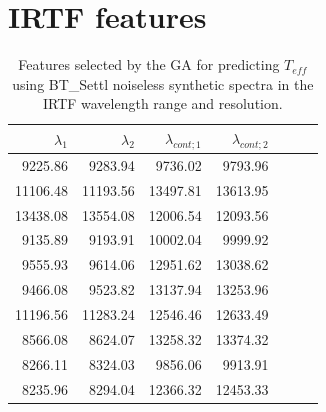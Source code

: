 
  \section{IRTF features}
\label{app:features:irtf}


%
% 
\begin{table}
\begin{center}
\begin{tabular}{rrrrrrr}
  \hline
  $\lambda_1$ & $\lambda_2$ & $\lambda_{cont;1}$ & $\lambda_{cont;2} $ \\ 
  \hline
9225.86  & 9283.94   & 9736.02  & 9793.96 \\
11106.48 & 11193.56  & 13497.81 & 13613.95 \\
13438.08 & 13554.08  & 12006.54 & 12093.56 \\
9135.89  & 9193.91   & 10002.04 & 9999.92 \\
9555.93  & 9614.06   & 12951.62 & 13038.62 \\
9466.08  & 9523.82   & 13137.94 & 13253.96 \\
11196.56 & 11283.24  & 12546.46 & 12633.49 \\
8566.08  & 8624.07   & 13258.32 & 13374.32 \\
8266.11  & 8324.03   & 9856.06  & 9913.91 \\
8235.96  & 8294.04   & 12366.32 & 12453.33 \\
\hline
\end{tabular}
\caption {Features selected by the GA for predicting $T_{eff}$ using
  BT\_Settl noiseless synthetic spectra in the IRTF wavelength range
  and resolution. } \label{tab:irtf-teff-noiseless}
\end{center}
\end{table}

